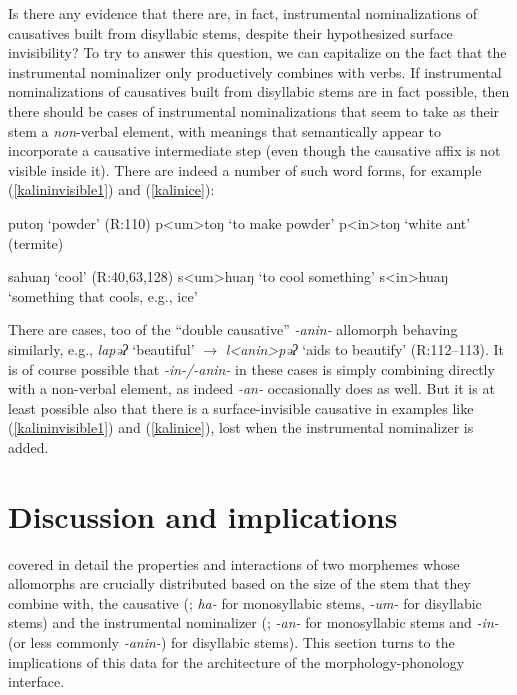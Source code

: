 \documentclass[output=paper]{langscibook}
\begin{document}

Is there any evidence that there are, in fact, instrumental nominalizations of causatives built from disyllabic stems, despite their hypothesized surface invisibility? To try to answer this question, we can capitalize on the fact that the instrumental nominalizer only productively combines with verbs. If instrumental nominalizations of causatives built from disyllabic stems are in fact possible, then there should be cases of instrumental nominalizations that seem to take as their stem a {\it non}-verbal element, with meanings that semantically appear to incorporate a causative intermediate step (even though the causative affix is not visible inside it). There are indeed a number of such word forms, for example (\ref{kalininvisible1}) and (\ref{kalinice}):

\ea
\ea putoŋ `powder' \hfill (R:110)
\ex p<um>toŋ `to make powder'
\ex p<in>toŋ `white ant' (termite)\label{kalininvisible1}
\z
\z

\ea \ea sahuaŋ `cool' \hfill (R:40,63,128)
\ex s<um>huaŋ `to cool something' 
\ex s<in>huaŋ `something that cools, e.g., ice'\label{kalinice}
\z
\z

\noindent There are cases, too of the ``double causative'' \textit{-anin-} allomorph behaving similarly, e.g., \textit{lapəʔ} `beautiful' $\rightarrow$ \textit{l<anin>pəʔ} `aids to beautify' (R:112--113). It is of course possible that \textit{-in-/-anin-} in these cases is simply combining directly with a non-verbal element, as indeed \textit{-an-} occasionally does as well. But it is at least possible also that there is a surface-invisible causative in examples like (\ref{kalininvisible1}) and (\ref{kalinice}), lost when the instrumental nominalizer is added. 

\section{Discussion and implications}\label{sec:kalin:4}

 covered in detail the properties and interactions of two morphemes whose allomorphs are crucially distributed based on the size of the stem that they combine with, the causative (; \textit{ha-} for monosyllabic stems, \textit{-um-} for disyllabic stems) and the instrumental nominalizer (; \textit{-an-} for monosyllabic stems and \textit{-in-} (or less commonly \textit{-anin-}) for disyllabic stems). This section turns to the implications of this data for the architecture of the morphology-phonology interface. 
\end{document}
